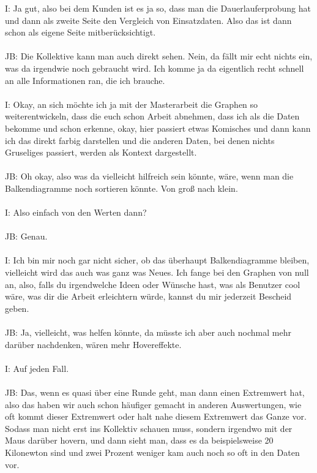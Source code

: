 \begin{linenumbers}
I: Ja gut, also bei dem Kunden ist es ja so, dass man die Dauerlauferprobung hat und dann als zweite Seite den Vergleich von Einsatzdaten. Also das ist dann schon als eigene Seite mitberücksichtigt. \\\\
JB:  Die Kollektive kann man auch direkt sehen. Nein, da fällt mir echt nichts ein, was da irgendwie noch gebraucht wird. Ich komme ja da eigentlich recht schnell an alle Informationen ran, die ich brauche.\\\\
I: Okay, an sich möchte ich ja mit der Masterarbeit die Graphen so weiterentwickeln, dass die euch schon Arbeit abnehmen, dass ich als die Daten bekomme und schon erkenne, okay, hier passiert etwas Komisches und dann kann ich das direkt farbig darstellen und die anderen Daten, bei denen nichts Gruseliges passiert, werden als Kontext dargestellt.\\\\
JB: Oh okay, also was da vielleicht hilfreich sein könnte, wäre, wenn man die Balkendiagramme noch sortieren könnte. Von groß nach klein.\\\\
I: Also einfach von den Werten dann?\\\\
JB: Genau.\\\\
I: Ich bin mir noch gar nicht sicher, ob das überhaupt Balkendiagramme bleiben, vielleicht wird das auch was ganz was Neues. Ich fange bei den Graphen von null an, also, falls du irgendwelche Ideen oder Wünsche hast, was als Benutzer cool wäre, was dir die Arbeit erleichtern würde, kannst du mir jederzeit Bescheid geben.\\\\
JB: Ja, vielleicht, was helfen könnte, da müsste ich aber auch nochmal mehr darüber nachdenken, wären mehr Hovereffekte.\\\\
I: Auf jeden Fall.\\\\
JB: Das, wenn es quasi über eine Runde geht, man dann einen Extremwert hat, also das haben wir auch schon häufiger gemacht in anderen Auswertungen, wie oft kommt dieser Extremwert oder halt nahe diesem Extremwert das Ganze vor. Sodass man nicht erst ins Kollektiv schauen muss, sondern irgendwo mit der Maus darüber hovern, und dann sieht man, dass es da beispielsweise 20 Kilonewton sind und zwei Prozent weniger kam auch noch so oft in den Daten vor.\\\\

\end{linenumbers}
